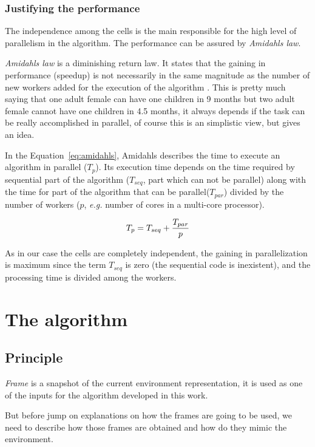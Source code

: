 \subsubsection{Justifying the performance}

The independence among the cells is the main responsible for the high level of parallelism in the algorithm. The performance can be assured by \textit{Amidahls law}.

\textit{Amidahls law} is a diminishing return law. It states that the gaining in performance (speedup) is not necessarily in the same magnitude as the number of new workers added for the execution of the algorithm \cite{Amdahl:1967:VSP:1465482.1465560}. This is pretty much saying that one adult female can have one children in 9 months but two adult female cannot have one children in 4.5 months, it always depends if the task can be really accomplished in parallel, of course this is an simplistic view, but gives an idea.

In the Equation~\ref{eq:amidahls}, Amidahls describes the time to execute an algorithm in parallel ($T_p$). Its execution time depends on the time required by sequential part of the algorithm ($T_{seq}$, part which can not be parallel) along with the time for part of the algorithm that can be parallel($T_{par}$) divided by the number of workers ($p$, \textit{e.g.} number of cores in a multi-core processor).

\begin{equation}
\label{eq:amidahls}
T_p=T_{seq}+{T_{par} \over p}
\end{equation}

As in our case the cells are completely independent, the gaining in parallelization is maximum since the term $T_{seq}$ is zero (the sequential code is inexistent), and the processing time is divided among the workers.

\section{The algorithm}

\subsection{Principle} 

\textit{Frame} is a snapshot of the current environment representation, it is used as one of the inputs for the algorithm developed in this work.

But before jump on explanations on how the frames are going to be used, we need to describe how those frames are obtained and how do they mimic the environment.

